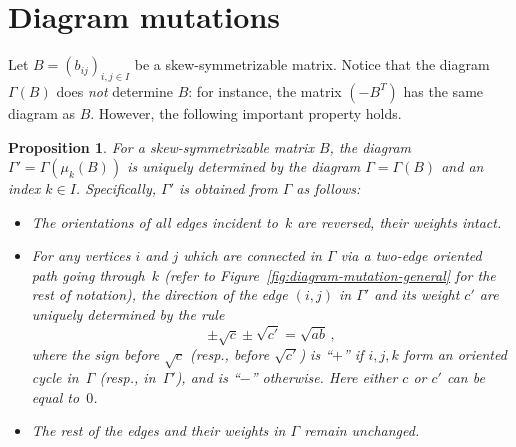\documentclass[letterpaper]{amsart}
\numberwithin{equation}{section}
\newtheorem{proposition}[theorem]{Proposition}
\theoremstyle{definition}
\begin{document}
 
\section{Diagram mutations} 
\label{sec:diagram-mutations} 
 
Let $B = (b_{ij})_{i,j \in I}$ be a skew-symmetrizable matrix. 
Notice that the diagram $\Gamma (B)$ does \emph{not} determine $B$: for 
instance, the matrix $(-B^T)$ has the same diagram as $B$. 
However, the following important property holds. 
 
\begin{proposition} 
\label{pr:diagram-mutation} 
For a skew-symmetrizable matrix $B$, 
the diagram $\Gamma'\!\!=\!\Gamma(\mu_k(B))$ is uniquely determined by 
the diagram $\Gamma=\Gamma(B)$ and an index $k\in I$. 
Specifically, $\Gamma'$ is obtained from $\Gamma$ as follows: 
\begin{itemize} 
\item The orientations of all edges incident to~$k$ are reversed, 
their weights intact. 
\item 
For any vertices $i$ and $j$ which are connected in 
$\Gamma$ via a two-edge oriented path going through~$k$ (refer to 
Figure~\ref{fig:diagram-mutation-general} for the rest of notation), 
the direction of the edge $(i,j)$ in $\Gamma'$ and its weight $c'$ 
are uniquely determined by the rule 
\begin{equation} 
\label{eq:weight-relation-general} 
\pm\sqrt {c} \pm\sqrt {c'} = \sqrt {ab} \,, 
\end{equation} 
where the sign before $\sqrt {c}$ 
(resp., before $\sqrt {c'}$) 
is ``$+$'' if $i,j,k$ form an oriented cycle 
in~$\Gamma$ (resp., in~$\Gamma'$), and is ``$-$'' otherwise. 
Here either $c$ or $c'$ can be equal to~$0$. 
 
\item 
The rest of the edges and their weights in $\Gamma$ 
remain unchanged. 
\end{itemize} 
\end{proposition} 
 
\end{document}
